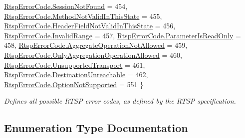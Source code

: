 \begin{DoxyCompactItemize}
\hyperlink{namespace_surge_xamarini_o_s_bindings_af9fd93680b94cd5a99c018ef98b65ec2a999a3e96785a44f4829c7e95f5497432}{Rtsp\+Error\+Code.\+Session\+Not\+Found} = 454, 
\newline
\hyperlink{namespace_surge_xamarini_o_s_bindings_af9fd93680b94cd5a99c018ef98b65ec2a2c2dc1f697c4183cf8165feb68bf30e0}{Rtsp\+Error\+Code.\+Method\+Not\+Valid\+In\+This\+State} = 455, 
\hyperlink{namespace_surge_xamarini_o_s_bindings_af9fd93680b94cd5a99c018ef98b65ec2a1e519c15a4c8e5b98c82cf026b15daa8}{Rtsp\+Error\+Code.\+Header\+Field\+Not\+Valid\+In\+This\+State} = 456, 
\hyperlink{namespace_surge_xamarini_o_s_bindings_af9fd93680b94cd5a99c018ef98b65ec2aefcb4954ae74945cf0eba28983e28b6e}{Rtsp\+Error\+Code.\+Invalid\+Range} = 457, 
\hyperlink{namespace_surge_xamarini_o_s_bindings_af9fd93680b94cd5a99c018ef98b65ec2a1a59987567a7d6c784bbc3c143ff4699}{Rtsp\+Error\+Code.\+Parameter\+Is\+Read\+Only} = 458, 
\newline
\hyperlink{namespace_surge_xamarini_o_s_bindings_af9fd93680b94cd5a99c018ef98b65ec2a82bf5678170e4437d8cd2062da4f52d4}{Rtsp\+Error\+Code.\+Aggregate\+Operation\+Not\+Allowed} = 459, 
\hyperlink{namespace_surge_xamarini_o_s_bindings_af9fd93680b94cd5a99c018ef98b65ec2a345d96ac2c122b04213af27972e8e33a}{Rtsp\+Error\+Code.\+Only\+Aggregation\+Operation\+Allowed} = 460, 
\hyperlink{namespace_surge_xamarini_o_s_bindings_af9fd93680b94cd5a99c018ef98b65ec2ae6058ef75d38a5dd79bc0d9a2cc80e8b}{Rtsp\+Error\+Code.\+Unsupported\+Transport} = 461, 
\hyperlink{namespace_surge_xamarini_o_s_bindings_af9fd93680b94cd5a99c018ef98b65ec2ad4fbeceabd9b5fd7e31cc0f9b1db1c73}{Rtsp\+Error\+Code.\+Destination\+Unreachable} = 462, 
\newline
\hyperlink{namespace_surge_xamarini_o_s_bindings_af9fd93680b94cd5a99c018ef98b65ec2adb9e192ba67e270e21abbae2d98426b9}{Rtsp\+Error\+Code.\+Option\+Not\+Supported} = 551
 \}\begin{DoxyCompactList}\small\item\em Defines all possible R\+T\+SP error codes, as defined by the R\+T\+SP specification. \end{DoxyCompactList}
\end{DoxyCompactItemize}


\subsection{Enumeration Type Documentation}
\mbox{\label{namespace_surge_xamarini_o_s_bindings_af9fd93680b94cd5a99c018ef98b65ec2}} 
